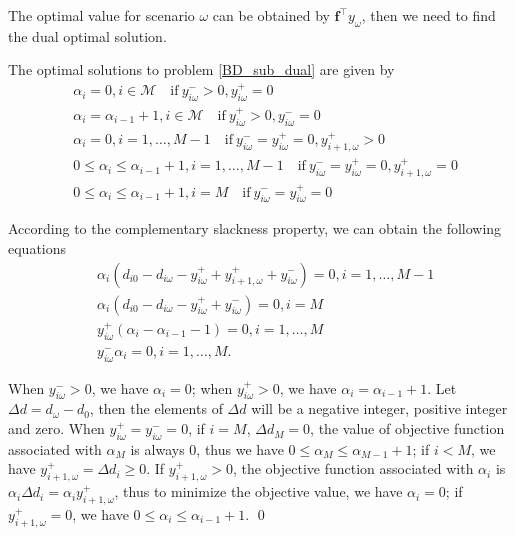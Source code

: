 The optimal value for scenario $\omega$ can be obtained by $\mathbf{f}^{\intercal} y_{\omega}$, then we need to find the dual optimal solution.


\begin{thm}\label{optimal_sol_sub_dual}
  The optimal solutions to problem \eqref{BD_sub_dual} are given by 
\begin{equation}\label{BD_sub_simplified}
  \begin{aligned}
    & \alpha_{i} = 0, i \in \mathcal{M} \quad \text{if}~  y_{i \omega}^{-} > 0,  y_{i \omega}^{+} = 0   \\
    & \alpha_{i} = \alpha_{i-1}+1, i \in \mathcal{M} \quad \text{if}~ y_{i \omega}^{+} > 0,  y_{i \omega}^{-} = 0 \\
    & \alpha_{i} = 0, i =1,\ldots, M-1 \quad \text{if}~ y_{i \omega}^{-} = y_{i \omega}^{+} = 0, y_{i+1, \omega}^{+}> 0 \\
    & 0 \leq \alpha_{i} \leq \alpha_{i-1}+1, i =1,\ldots, M-1 \quad \text{if}~ y_{i \omega}^{-} = y_{i \omega}^{+} = 0, y_{i+1, \omega}^{+}= 0 \\
    & 0 \leq \alpha_{i} \leq \alpha_{i-1}+1, i = M \quad \text{if}~ y_{i \omega}^{-} = y_{i \omega}^{+} = 0
  \end{aligned}
\end{equation}
\end{thm}

\begin{pf}
According to the complementary slackness property, we can obtain the following equations
\begin{align*}
  & \alpha_{i} (d_{i0} - d_{i \omega} - y_{i \omega}^{+} + y_{i+1, \omega}^{+} + y_{i \omega}^{-}) = 0, i =1,\ldots, M-1 \\
  & \alpha_{i} (d_{i0} - d_{i \omega} - y_{i \omega}^{+}+ y_{i \omega}^{-}) = 0, i = M \\
  & y_{i \omega}^{+}(\alpha_{i} - \alpha_{i-1}-1) = 0, i =1,\ldots, M \\
  & y_{i \omega}^{-} \alpha_{i} = 0, i =1,\ldots, M.
\end{align*}

When $y_{i \omega}^{-} >0$, we have $\alpha_{i} =0$; when $y_{i \omega}^{+} >0$, we have $\alpha_{i} = \alpha_{i-1} +1$.
Let $\Delta d = d_{\omega} - d_0$, then the elements of $\Delta d$ will be a negative integer, positive integer and zero.
When $y_{i \omega}^{+} = y_{i \omega}^{-} = 0$, if $i = M$, $\Delta d_{M} =0$, the value of objective function associated with $\alpha_{M}$ is always $0$, thus we have $0 \leq \alpha_{M} \leq \alpha_{M-1}+1$; if $i < M$, we have $y_{i+1, \omega}^{+} = \Delta d_{i} \geq 0$. If $y_{i+1, \omega}^{+} > 0$, the objective function associated with $\alpha_i$ is $\alpha_{i} \Delta d_{i} = \alpha_{i} y_{i+1, \omega}^{+}$, thus to minimize the objective value, we have $\alpha_i =0$; if $y_{i+1, \omega}^{+} = 0$, we have $0 \leq \alpha_{i} \leq \alpha_{i-1} +1$.
\qed
\end{pf}

